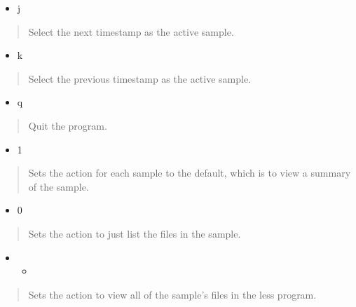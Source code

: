 \documentclass[letterpaper,10pt,english]{sphinxmanual}
\begin{document}
\begin{itemize}
\item {} 
j

\end{itemize}
\begin{quote}

Select the next timestamp as the active sample.
\end{quote}
\begin{itemize}
\item {} 
k

\end{itemize}
\begin{quote}

Select the previous timestamp as the active sample.
\end{quote}
\begin{itemize}
\item {} 
q

\end{itemize}
\begin{quote}

Quit the program.
\end{quote}
\begin{itemize}
\item {} 
1

\end{itemize}
\begin{quote}

Sets the action for each sample to the default, which is to view a summary
of the sample.
\end{quote}
\begin{itemize}
\item {} 
0

\end{itemize}
\begin{quote}

Sets the action to just list the files in the sample.
\end{quote}
\begin{itemize}
\item {} \begin{itemize}
\item {} 
\end{itemize}

\end{itemize}
\begin{quote}

Sets the action to view all of the sample’s files in the less program.
\end{quote}
\end{document}
